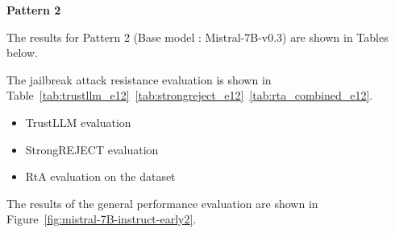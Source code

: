 \documentclass[conference,compsoc]{IEEEtran}
\begin{document}


\textbf{Pattern 2}

The results for Pattern 2 (Base model : Mistral-7B-v0.3) are shown in Tables below.

The jailbreak attack resistance evaluation is shown in Table~\ref{tab:trustllm_e12}~\ref{tab:strongreject_e12}~\ref{tab:rta_combined_e12}.  
\begin{itemize}
    \item TrustLLM evaluation  
    \item StrongREJECT evaluation  
    \item RtA evaluation on the dataset  
\end{itemize}  
The results of the general performance evaluation are shown in Figure~\ref{fig:mistral-7B-instruct-early2}.  
\end{document}
